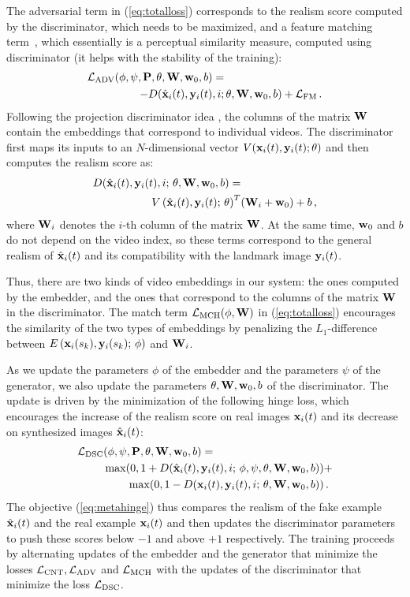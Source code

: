 \documentclass[10pt,twocolumn,letterpaper]{article}
\newcommand{\eq}[1]{(\ref{eq:#1})}
\begin{document}
The adversarial term in \eq{totalloss} corresponds to the realism score computed by the discriminator, which needs to be maximized, and a feature matching term~\cite{Wang18b}, which essentially is a perceptual similarity measure, computed using discriminator (it helps with the stability of the training):
\begin{align} \label{eq:advers}
    \mathcal{L}_\text{ADV}(\phi,\psi,\mathbf{P},\theta,\mathbf{W},\mathbf{w}_0,b) = &\\ -D(\hat{\mathbf{x}}_i(t),\mathbf{y}_i(t),i;&\,\theta,\mathbf{W},\mathbf{w}_0,b) + \mathcal{L}_\text{FM}\,. \nonumber
\end{align}
Following the projection discriminator idea \cite{Miyato18a}, the columns of the matrix $\mathbf{W}$ contain the embeddings that correspond to individual videos. The discriminator first maps its inputs to an $N$-dimensional vector $V(\mathbf{x}_i(t),\mathbf{y}_i(t);\theta)$ and then computes the realism score as: 
\begin{align} \label{eq:metadisc}
    D(\hat{\mathbf{x}}_i(t),\mathbf{y}_i(t),i;\,\theta,\mathbf{W},\mathbf{w}_0,b) =&\\ V\left(\hat{\mathbf{x}}_i(t),\mathbf{y}_i(t);\,\theta\right)^T&(\mathbf{W}_i+\mathbf{w}_0)+b\,,\nonumber
\end{align}
where $\mathbf{W}_i$ denotes the $i$-th column of the matrix $\mathbf{W}$. At the same time, $\mathbf{w}_0$ and $b$ do not depend on the video index, so these terms correspond to the general realism of $\hat{\mathbf{x}}_i(t)$ and its compatibility with the landmark image $\mathbf{y}_i(t)$.

Thus, there are two kinds of video embeddings in our system: the ones computed by the embedder, and the ones that correspond to the columns of the matrix $\mathbf{W}$ in the discriminator. The match term $\mathcal{L}_\text{MCH}(\phi, \mathbf{W})$ in \eq{totalloss} encourages the similarity of the two types of embeddings by penalizing the $L_1$-difference between $E\left(\mathbf{x}_i(s_k),\mathbf{y}_i(s_k);\,\phi\right)$ and $\mathbf{W}_i$.

As we update the parameters $\phi$ of the embedder and the parameters $\psi$ of the generator, we also update the parameters $\theta,\mathbf{W},\mathbf{w}_0,b$ of the discriminator. The update is driven by the minimization of the following hinge loss, which encourages the increase of the realism score on real images $\mathbf{x}_i(t)$ and its decrease on synthesized images $\hat{\mathbf{x}}_i(t)$:
\begin{align} \label{eq:metahinge}
   \mathcal{L}_\text{DSC}&(\phi,\psi,\mathbf{P},\theta,\mathbf{W},\mathbf{w}_0,b) = \\
   &\max(0,1+D(\hat{\mathbf{x}}_i(t),\mathbf{y}_i(t),i;\,\phi,\psi,\theta,\mathbf{W},\mathbf{w}_0,b)) +\nonumber\\
   &\qquad\,\max(0,1-D(\mathbf{x}_i(t),\mathbf{y}_i(t),i;\,\theta,\mathbf{W},\mathbf{w}_0,b))\,.\nonumber
\end{align}
The objective \eq{metahinge} thus compares the realism of the fake example $\hat{\mathbf{x}}_i(t)$ and the real example $\mathbf{x}_i(t)$ and then updates the discriminator parameters to push these scores below $-1$ and above $+1$ respectively. The training proceeds by alternating updates of the embedder and the generator that minimize the losses $\mathcal{L}_\text{CNT},\mathcal{L}_\text{ADV}$ and $\mathcal{L}_\text{MCH}$ with the updates of the discriminator that minimize the loss $\mathcal{L}_\text{DSC}$.
\end{document}
